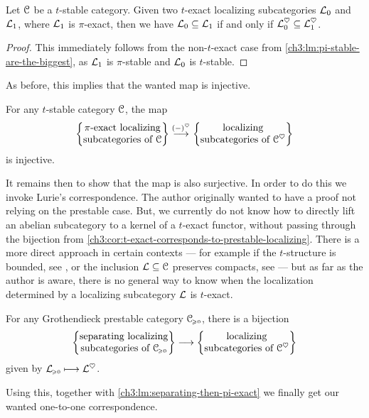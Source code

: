\begin{lemma}
    \label{ch3:lm:pi-exact-are-the-biggest}
    Let $\EuScript{C}$ be a $t$-stable category. Given two $t$-exact localizing subcategories $\mathcal{L}_0$ and $\mathcal{L}_1$, where $\mathcal{L}_1$ is $\pi$-exact, then we have $\mathcal{L}_0 \subseteq \mathcal{L}_1$ if and only if $\mathcal{L}_0^\heartsuit \subseteq \mathcal{L}_1^\heartsuit$. 
\end{lemma}
\begin{proof}
    This immediately follows from the non-$t$-exact case from \cref{ch3:lm:pi-stable-are-the-biggest}, as $\mathcal{L}_1$ is $\pi$-stable and $\mathcal{L}_0$ is $t$-stable. 
\end{proof}

As before, this implies that the wanted map is injective. 

\begin{corollary}
    \label{ch3:cor:pi-exact-heart-injective}
    For any $t$-stable category $\EuScript{C}$, the map
    \[\left\{ \begin{matrix} \pi\text{-exact localizing}\\ \text{subcategories of }\EuScript{C} \end{matrix} \right\} \overset{(-)^\heartsuit}{\longrightarrow} \left\{ \begin{matrix} \text{localizing}\\ \text{subcategories of }\EuScript{C}^\heartsuit \end{matrix} \right\}\]
    is injective. 
\end{corollary}

It remains then to show that the map is also surjective. In order to do this we invoke Lurie's correspondence. The author originally wanted to have a proof not relying on the prestable case. But, we currently do not know how to directly lift an abelian subcategory to a kernel of a $t$-exact functor, without passing through the bijection from \cref{ch3:cor:t-exact-corresponds-to-prestable-localizing}. There is a more direct approach in certain contexts --- for example if the $t$-structure is bounded, see \cite[2.20]{antieau-gepner-heller_2019}, or the inclusion $\mathcal{L}\subseteq \EuScript{C}$ preserves compacts, see \cite[2.7]{hennion-porta-vezzosi_2016} --- but as far as the author is aware, there is no general way to know when the localization determined by a localizing subcategory $\mathcal{L}$ is $t$-exact. 

\begin{theorem}
    \label{ch3:thm:Lurie-correspondence}
    For any Grothendieck prestable category $\EuScript{C}_{\hspace{-1pt}\scriptscriptstyle\geqslant 0}$, there is a bijection 
    \[\left\{ \begin{matrix} \text{separating localizing}\\ \text{subcategories of }\EuScript{C}_{\hspace{-1pt}\scriptscriptstyle\geqslant 0} \end{matrix} \right\} \longrightarrow \left\{ \begin{matrix} \text{localizing}\\ \text{subcategories of }\EuScript{C}^\heartsuit \end{matrix} \right\}\]
    given by $\mathcal{L}_{\hspace{-1pt}\scriptscriptstyle\geqslant 0}\longmapsto \mathcal{L}^\heartsuit$. 
\end{theorem}

Using this, together with \cref{ch3:lm:separating-then-pi-exact} we finally get our wanted one-to-one correspondence. 

